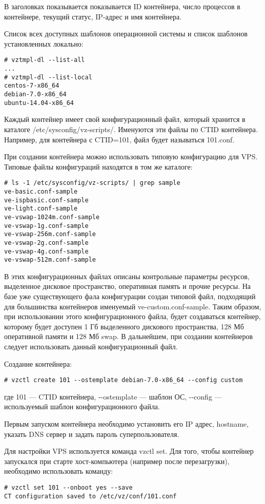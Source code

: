 В заголовках показывается показывается ID контейнера, число процессов в контейнере, текущий статус, IP-адрес и имя контейнера.

Список всех доступных шаблонов операционной системы и список шаблонов установленных локально:
\begin{lstlisting}
# vztmpl-dl --list-all
...
# vztmpl-dl --list-local
centos-7-x86_64
debian-7.0-x86_64
ubuntu-14.04-x86_64
\end{lstlisting}

Каждый контейнер имеет свой конфигурационный файл, который хранится в каталоге /etc/sysconfig/vz-scripts/.
Именуются эти файлы по CTID контейнера.
Например, для контейнера с CTID=101, файл будет называться 101.conf.

При создании контейнера можно использовать типовую конфигурацию для VPS.
Типовые файлы конфигураций находятся в том же каталоге:
\begin{lstlisting}
# ls -1 /etc/sysconfig/vz-scripts/ | grep sample
ve-basic.conf-sample
ve-ispbasic.conf-sample
ve-light.conf-sample
ve-vswap-1024m.conf-sample
ve-vswap-1g.conf-sample
ve-vswap-256m.conf-sample
ve-vswap-2g.conf-sample
ve-vswap-4g.conf-sample
ve-vswap-512m.conf-sample
\end{lstlisting}

В этих конфигурационных файлах описаны контрольные параметры ресурсов, выделенное дисковое пространство, оперативная память и прочие ресурсы.
На базе уже существующего фала конфигурации создан типовой файл, подходящий для большинства контейнеров именуемый ve-custom.conf-sample.
Таким образом, при использовании этого конфигурационного файла, будет создаваться контейнер, которому будет доступен 1 Гб выделенного дискового пространства, 128 Мб оперативной памяти и 128 Мб swap.
В дальнейшем, при создании контейнеров следует использовать данный конфигурационный файл.

Создание контейнера:
\begin{lstlisting}
# vzctl create 101 --ostemplate debian-7.0-x86_64 --config custom
\end{lstlisting}
где 101 --- CTID контейнера, -{}-ostemplate --- шаблон ОС, -{}-config --- используемый шаблон конфигурационного файла.

Первым запуском контейнера необходимо установить его IP адрес, hostname, указать DNS сервер и задать пароль суперпользователя.

Для настройки VPS используется команда vzctl set.
Для того, чтобы контейнер запускался при старте хост-компьютера (например после перезагрузки), необходимо использовать команду:
\begin{lstlisting}
# vzctl set 101 --onboot yes --save
CT configuration saved to /etc/vz/conf/101.conf
\end{lstlisting}

